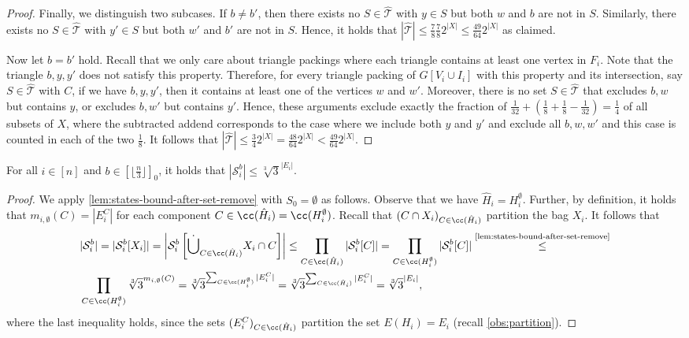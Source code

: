 \documentclass[a4paper,UKenglish,cleveref, autoref, thm-restate]{lipics-v2021}
\begin{document}
\begin{proof}
    Finally, we distinguish two subcases. If $b \neq b'$, then there exists no $S\in\hat{\mathcal{T}}$ with $y\in S$ but both $w$ and $b$ are not in $S$. Similarly, there exists no $S\in\hat{\mathcal{T}}$ with $y'\in S$ but both $w'$ and $b'$ are not in $S$. Hence, it holds that $|\hat{\mathcal{T}}| \leq \frac{7}{8}\frac{7}{8} 2^{|X|} \leq \frac{49}{64} 2^{|X|}$ as claimed. 
    
    Now let $b=b'$ hold. 
    Recall that we only care about triangle packings where each triangle contains at least one vertex in $F_i$.
    Note that the triangle $b,y,y'$ does not satisfy this property.
    Therefore, for every triangle packing of $G[V_i \cup I_i]$ with this property and its intersection, say $S \in \hat{\mathcal{T}}$ with $C$, if we have $b,y,y'$, then it contains at least one of the vertices $w$ and $w'$. 
    Moreover, there is no set $S \in \hat{\mathcal{T}}$ that excludes $b,w$ but contains $y$, or excludes $b,w'$ but contains $y'$. 
    Hence, these arguments exclude exactly the fraction of $\frac{1}{32}+(\frac{1}{8}+\frac{1}{8}-\frac{1}{32}) = \frac{1}{4}$ of all subsets of $X$, where the subtracted addend corresponds to the case where we include both $y$ and $y'$ and exclude all $b,w,w'$ and this case is counted in each of the two $\frac{1}{8}$. 
    It follows that $|\hat{\mathcal{T}}| \leq \frac{3}{4}2^{|X|} = \frac{48}{64} 2^{|X|} < \frac{49}{64} 2^{|X|}$.
\end{proof}

\begin{corollary}\label{cor:states-bound-at-checkpoint-bags}
    For all $i\in[n]$ and $b\in [\lfloor\frac{n}{3}\rfloor]_0$, it holds  that $|\mathcal{S}_i^b| \leq \sqrt[3]{3}^{|E_i|}$.
\end{corollary}

\begin{proof}
    We apply \cref{lem:states-bound-after-set-remove} with $S_0 = \emptyset$ as follows.
    Observe that we have $\hat{H}_i = H_i^\emptyset$.
    Further, by definition, it holds that $m_{i,\emptyset}(C) = |E_i^C|$ for each component $C\in \cc(\hat{H}_i) = \cc(H_i^{\emptyset})$.
    Recall that $(C \cap X_i)_{C\in \cc(\hat{H}_i)}$ partition the bag $X_i$. 
    It follows that
    \begin{align*} 
    &|\mathcal{S}_i^b| = |\mathcal{S}_i^b[X_i]| = \left|\mathcal{S}_i^b\left[\dot\bigcup_{C \in \cc(\hat{H}_i)} X_i \cap C\right]\right|
    \leq \prod_{C\in\cc(\hat{H}_i)} |\mathcal{S}_i^b[C]|
    = \prod_{C\in\cc(H_i^{\emptyset})} |\mathcal{S}_i^b[C]| 
    \stackrel{\text{\cref{lem:states-bound-after-set-remove}}}{\leq} \\ &\prod_{C\in\cc(H_i^{\emptyset})} \sqrt[3]{3}^{m_{i,\emptyset}(C)}
    = \sqrt[3]{3}^{\sum_{C\in\cc(H_i^{\emptyset})} |E_i^C|} = \sqrt[3]{3}^{\sum_{C\in\cc(\hat{H}_i)} |E_i^C|} = \sqrt[3]{3}^{|E_i|},
    \end{align*}
    where the last inequality holds, since the sets $(E_i^C)_{C \in \cc(\hat{H}_i)}$ partition the set $E(H_i)= E_i$ (recall \cref{obs:partition}).
\end{proof}
\end{document}
